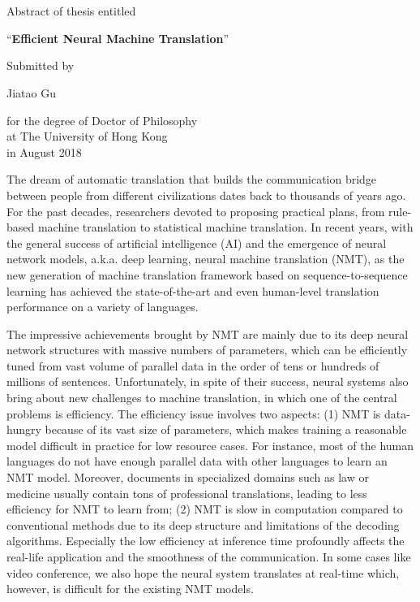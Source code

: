\chapter*{}
\vspace{-140pt}
\begin{center}
  \large
  Abstract of thesis entitled            \par
  \Large
  ``{\bf Efficient Neural Machine Translation}''                            \par
  \large
                                         \vspace*{0.2in}
  Submitted by                           \par
  Jiatao Gu                               \par
                                         \vspace*{0.2in}
  for the degree of Doctor of Philosophy \\
  at The University of Hong Kong         \\
  in August 2018
  \end{center}



The dream of automatic translation that builds the communication bridge between people from different civilizations dates back to thousands of years ago. 
For the past decades, researchers devoted to proposing practical plans, from rule-based machine translation to statistical machine translation. 
In recent years, with the general success of artificial intelligence (AI) and the emergence of neural network models, a.k.a. deep learning, neural machine translation (NMT), 
as the new generation of machine translation framework based on sequence-to-sequence learning has achieved the state-of-the-art and even human-level translation performance on a variety of languages.

The impressive achievements brought by NMT are mainly due to its deep neural network structures with massive numbers of parameters, 
which can be efficiently tuned from vast volume of parallel data in the order of tens or hundreds of millions of sentences. 
Unfortunately, in spite of their success, neural systems also bring about new challenges to machine translation, in which one of the central problems is efficiency. 
The efficiency issue involves two aspects: 
(1) NMT is data-hungry because of its vast size of parameters, which makes training a reasonable model difficult in practice for low resource cases. 
For instance, most of the human languages do not have enough parallel data with other languages to learn an NMT model.
Moreover, documents in specialized domains such as law or medicine usually contain tons of professional translations, leading to less efficiency for NMT to learn from;
(2) NMT is slow in computation compared to conventional methods due to its deep structure and limitations of the decoding algorithms. 
Especially the low efficiency at inference time profoundly affects the real-life application and the smoothness of the communication. 
In some cases like video conference, we also hope the neural system translates at real-time which, however, is difficult for the existing NMT models. 

